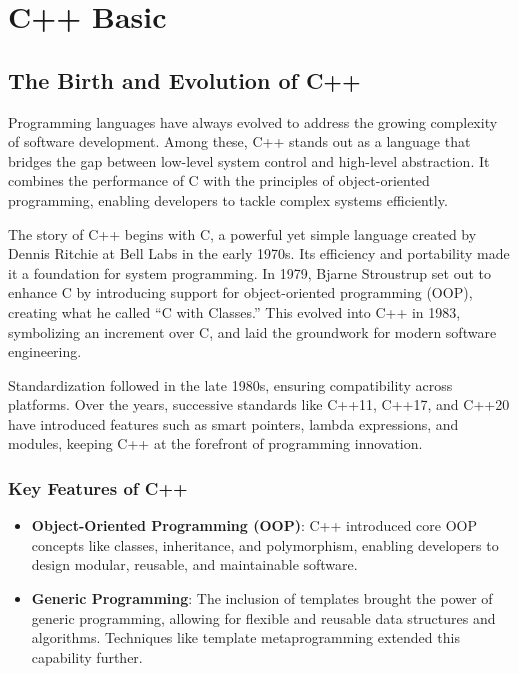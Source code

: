 \chapter{C++ Basic}

\section{The Birth and Evolution of C++}

Programming languages have always evolved to address the growing complexity of software development. Among these, C++ stands out as a language that bridges the gap between low-level system control and high-level abstraction. It combines the performance of C with the principles of object-oriented programming, enabling developers to tackle complex systems efficiently.

The story of C++ begins with C, a powerful yet simple language created by Dennis Ritchie at Bell Labs in the early 1970s. Its efficiency and portability made it a foundation for system programming. In 1979, Bjarne Stroustrup set out to enhance C by introducing support for object-oriented programming (OOP), creating what he called “C with Classes.” This evolved into C++ in 1983, symbolizing an increment over C, and laid the groundwork for modern software engineering.

Standardization followed in the late 1980s, ensuring compatibility across platforms. Over the years, successive standards like C++11, C++17, and C++20 have introduced features such as smart pointers, lambda expressions, and modules, keeping C++ at the forefront of programming innovation.

\subsection{Key Features of C++}

\begin{itemize}
    \item \textbf{Object-Oriented Programming (OOP)}: 
    C++ introduced core OOP concepts like classes, inheritance, and polymorphism, enabling developers to design modular, reusable, and maintainable software.
    
    \item \textbf{Generic Programming}: 
    The inclusion of templates brought the power of generic programming, allowing for flexible and reusable data structures and algorithms. Techniques like template metaprogramming extended this capability further.
\end{itemize}

